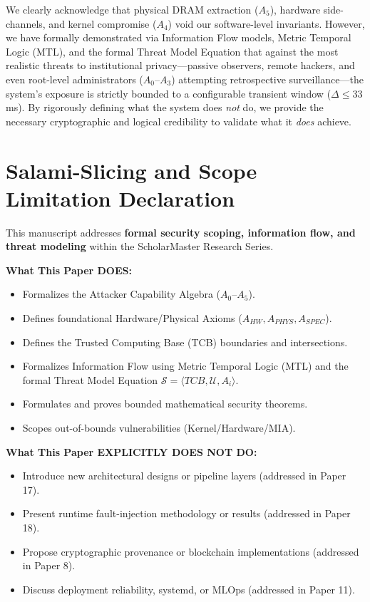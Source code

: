 \documentclass[conference]{IEEEtran}
\begin{document}
We clearly acknowledge that physical DRAM extraction ($A_5$), hardware side-channels, and kernel compromise ($A_4$) void our software-level invariants. However, we have formally demonstrated via Information Flow models, Metric Temporal Logic (MTL), and the formal Threat Model Equation that against the most realistic threats to institutional privacy—passive observers, remote hackers, and even root-level administrators ($A_0$--$A_3$) attempting retrospective surveillance—the system's exposure is strictly bounded to a configurable transient window ($\Delta \le 33$ms). By rigorously defining what the system does \textit{not} do, we provide the necessary cryptographic and logical credibility to validate what it \textit{does} achieve.

\section*{Salami-Slicing and Scope Limitation Declaration}
This manuscript addresses \textbf{formal security scoping, information flow, and threat modeling} within the ScholarMaster Research Series.

\textbf{What This Paper DOES:}
\begin{itemize}
    \item Formalizes the Attacker Capability Algebra ($A_0$--$A_5$).
    \item Defines foundational Hardware/Physical Axioms ($A_{HW}, A_{PHYS}, A_{SPEC}$).
    \item Defines the Trusted Computing Base (TCB) boundaries and intersections.
    \item Formalizes Information Flow using Metric Temporal Logic (MTL) and the formal Threat Model Equation $\mathcal{S} = \langle TCB, \mathcal{U}, A_i \rangle$.
    \item Formulates and proves bounded mathematical security theorems.
    \item Scopes out-of-bounds vulnerabilities (Kernel/Hardware/MIA).
\end{itemize}

\textbf{What This Paper EXPLICITLY DOES NOT DO:}
\begin{itemize}
    \item Introduce new architectural designs or pipeline layers (addressed in Paper 17).
    \item Present runtime fault-injection methodology or results (addressed in Paper 18).
    \item Propose cryptographic provenance or blockchain implementations (addressed in Paper 8).
    \item Discuss deployment reliability, systemd, or MLOps (addressed in Paper 11).
\end{itemize}
\end{document}
